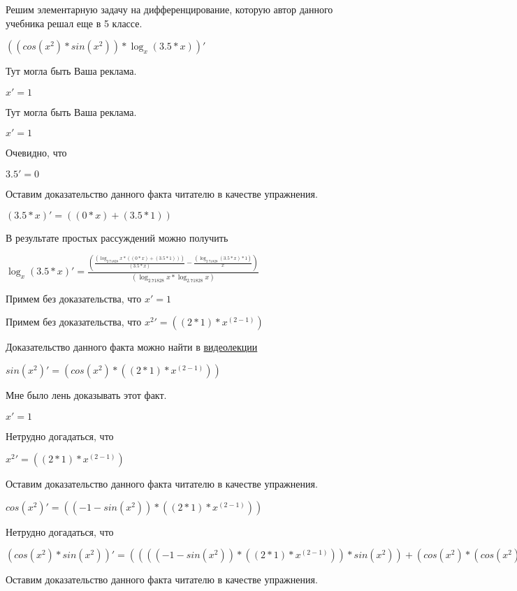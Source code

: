 \documentclass[12pt,a4paper,fleqn]{article}
\theoremstyle{definition}
\begin{document}
Решим элементарную задачу на дифференцирование, которую автор данного учебника решал еще в 5 классе.


$((cos({ x }^{ 2 }) * sin({ x }^{ 2 })) * \log_{ x }{( 3.5  *  x )})'$

Тут могла быть Ваша реклама.

$ x ' =  1 $

Тут могла быть Ваша реклама.

$ x ' =  1 $

Очевидно, что

$ 3.5 ' =  0 $

Оставим доказательство данного факта читателю в качестве упражнения.

$( 3.5  *  x )' = (( 0  *  x ) + ( 3.5  *  1 ))$

В результате простых рассуждений можно получить

$\log_{ x }{( 3.5  *  x )}' = \frac{(\frac{(\log_{ 2.71828 }{ x } * (( 0  *  x ) + ( 3.5  *  1 )))}{( 3.5  *  x )}
 - \frac{(\log_{ 2.71828 }{( 3.5  *  x )} *  1 )}{ x }
)}{(\log_{ 2.71828 }{ x } * \log_{ 2.71828 }{ x })}
$

Примем без доказательства, что
$ x ' =  1 $

Примем без доказательства, что
${ x }^{ 2 }' = (( 2  *  1 ) * { x }^{( 2  -  1 )})$

Доказательство данного факта можно найти в \href{https://www.youtube.com/watch?v=dQw4w9WgXcQ}{видеолекции}

$sin({ x }^{ 2 })' = (cos({ x }^{ 2 }) * (( 2  *  1 ) * { x }^{( 2  -  1 )}))$

Мне было лень доказывать этот факт.

$ x ' =  1 $

Нетрудно догадаться, что

${ x }^{ 2 }' = (( 2  *  1 ) * { x }^{( 2  -  1 )})$

Оставим доказательство данного факта читателю в качестве упражнения.

$cos({ x }^{ 2 })' = (( -1  - sin({ x }^{ 2 })) * (( 2  *  1 ) * { x }^{( 2  -  1 )}))$

Нетрудно догадаться, что

$(cos({ x }^{ 2 }) * sin({ x }^{ 2 }))' = (((( -1  - sin({ x }^{ 2 })) * (( 2  *  1 ) * { x }^{( 2  -  1 )})) * sin({ x }^{ 2 })) + (cos({ x }^{ 2 }) * (cos({ x }^{ 2 }) * (( 2  *  1 ) * { x }^{( 2  -  1 )}))))$

Оставим доказательство данного факта читателю в качестве упражнения.
\end{document}
